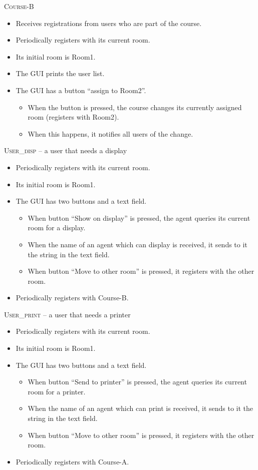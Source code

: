 \documentclass[a4paper, 12pt, twoside]{article}
\begin{document}
\textsc{Course-B}
\begin{itemize}
	\item Receives registrations from users who are part of the course.
	\item Periodically registers with its current room.
	\item Its initial room is Room1.
	\item The GUI prints the user list.
	\item The GUI has a button ``assign to Room2''.
	\begin{itemize}
		\item When the button is pressed, the course changes its currently assigned room (registers with Room2).
		\item When this happens, it notifies all users of the change.
	\end{itemize}
\end{itemize}

\newpage

\textsc{User\_disp} -- a user that needs a display
\begin{itemize}
	\item Periodically registers with its current room.
	\item Its initial room is Room1.
	\item The GUI has two buttons and a text field.
	\begin{itemize}
		\item When button ``Show on display'' is pressed, the agent queries its current room for a display.
		\item When the name of an agent which can display is received, it sends to it the string in the text field.
		\item When button ``Move to other room'' is pressed, it registers with the other room. 
	\end{itemize}
	\item Periodically registers with Course-B.
\end{itemize}


\textsc{User\_print} -- a user that needs a printer
\begin{itemize}
	\item Periodically registers with its current room.
	\item Its initial room is Room1.
	\item The GUI has two buttons and a text field.
	\begin{itemize}
		\item When button ``Send to printer'' is pressed, the agent queries its current room for a printer.
		\item When the name of an agent which can print is received, it sends to it the string in the text field.
		\item When button ``Move to other room'' is pressed, it registers with the other room. 
	\end{itemize}
	\item Periodically registers with Course-A.
\end{itemize}
\end{document}
